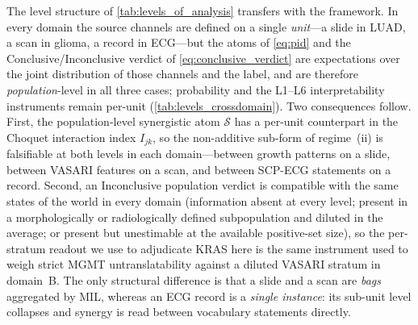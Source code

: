 \begin{table}[htbp]
\centering

\caption{\textbf{The translatability framework instantiated in three
domains.} Domain~A is reported in this paper; domains~B and~C are external
validations, largely measured
(\cref{tab:glioma_domainb,tab:ecg_domainc}) and partly predicted, with
data sources, source ontologies and the expected regime assignment fixed
in advance.}
\label{tab:crossdomain_protocol}
\end{table}

The level structure of \cref{tab:levels_of_analysis} transfers with
the framework. In every domain the source channels are defined on a
single \emph{unit}---a slide in LUAD, a scan in glioma, a record in
ECG---but the \pid{} atoms of \cref{eq:pid} and the
Conclusive/Inconclusive verdict of \cref{eq:conclusive_verdict} are
expectations over the joint distribution of those channels and the
label, and are therefore \emph{population}-level in all three cases;
probability and the L1--L6 interpretability instruments remain
per-unit (\cref{tab:levels_crossdomain}). Two consequences follow.
First, the population-level synergistic atom $\mathcal{S}$ has a
per-unit counterpart in the Choquet interaction index $I_{jk}$, so
the non-additive sub-form of regime~(ii) is falsifiable at both levels
in each domain---between
growth patterns on a slide, between VASARI features on a scan, and
between SCP-ECG statements on a record. Second, an Inconclusive
population verdict is compatible with the same states of the
world in every domain (information absent at every level; present in a
morphologically or radiologically defined subpopulation and diluted in
the average; or present but unestimable at the available positive-set
size), so the per-stratum readout we use to adjudicate KRAS here is the
same instrument used to weigh strict MGMT untranslatability against a
diluted VASARI stratum in domain~B. The only structural difference is
that a slide and a scan are \emph{bags} aggregated by MIL, whereas an
ECG record is a \emph{single instance}: its sub-unit level collapses
and synergy is read between vocabulary statements directly.

\begin{table}[htbp]
\centering

\caption{\textbf{The level structure of \cref{tab:levels_of_analysis}
generalised to the three domains.} Only the name of the unit and whether
it is a bag or a single instance change across domains---which is the
precise sense in which the framework, not the model weights, transfers.}
\label{tab:levels_crossdomain}
\end{table}

